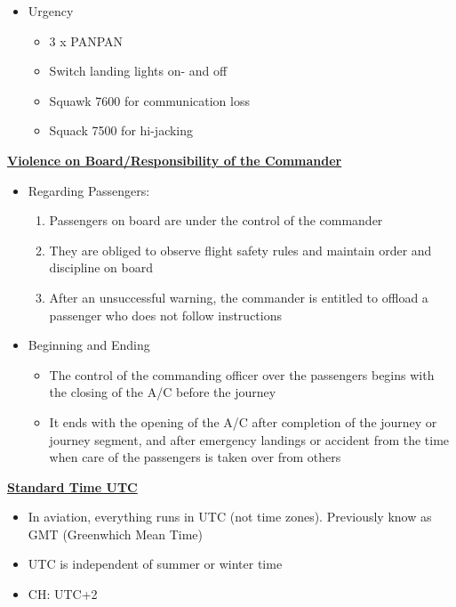 \documentclass[9pt, landscape, fleqn]{scrartcl}
\begin{document}
\begin{multicols*}{3}
\begin{itemize}
    \begin{itemize}
        \item SOS (morse)
        \item 3 x MAYDAY 
        \item Red rockets (in short intervals)
        \item Squawk 7700 (on Transponder)
    \end{itemize} 
    \item Urgency
    \begin{itemize}
        \item 3 x PANPAN 
        \item Switch landing lights on- and off 
        \item Squawk 7600 for communication loss 
        \item Squack 7500 for hi-jacking
    \end{itemize}
\end{itemize}
\underline{\textbf{Violence on Board/Responsibility of the Commander}}
\begin{itemize}
    \item Regarding Passengers:
    \begin{enumerate}
        \item Passengers on board are under the control of the commander 
        \item They are obliged to observe flight safety rules and maintain order and discipline on board 
        \item After an unsuccessful warning, the commander is entitled to offload a passenger who does not follow instructions 
    \end{enumerate}
    \item Beginning and Ending 
    \begin{itemize}
        \item The control of the commanding officer over the passengers begins with the closing of the A/C before the journey
        \item It ends with the opening of the A/C after completion of the journey or journey segment, and after emergency landings or accident from the time when care of the passengers is taken over from others 
    \end{itemize}
\end{itemize}
\underline{\textbf{Standard Time UTC}}
\begin{itemize}
    \item In aviation, everything runs in UTC (not time zones). Previously know as GMT (Greenwhich Mean Time)
    \item UTC is independent of summer or winter time 
    \item CH: UTC+2
\end{itemize}
\newpage

\end{multicols*}
\end{document}
